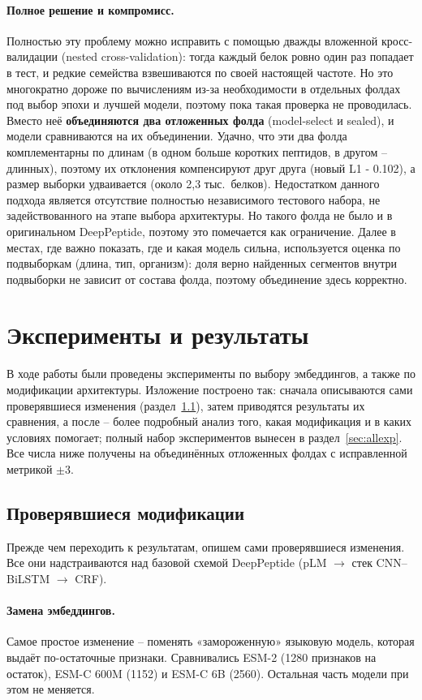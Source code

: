 \documentclass{article}
\begin{document}
\paragraph{Полное решение и компромисс.} Полностью эту проблему можно исправить с помощью дважды вложенной кросс-валидации (nested cross-validation): тогда каждый белок ровно один раз попадает в тест, и редкие семейства взвешиваются по своей настоящей частоте. Но это многократно дороже по вычислениям из-за необходимости в отдельных фолдах под выбор эпохи и лучшей модели, поэтому пока такая проверка не проводилась. Вместо неё \textbf{объединяются два отложенных фолда} (model-select и sealed), и модели сравниваются на их объединении. Удачно, что эти два фолда комплементарны по длинам (в одном больше коротких пептидов, в другом -- длинных), поэтому их отклонения компенсируют друг друга (новый L1 - 0.102), а размер выборки удваивается (около 2{,}3 тыс.\ белков). Недостатком данного подхода является отсутствие полностью независимого тестового набора, не задействованного на этапе выбора архитектуры. Но такого фолда не было и в оригинальном DeepPeptide, поэтому это помечается как ограничение. Далее в местах, где важно показать, где и какая модель сильна, используется оценка по подвыборкам (длина, тип, организм): доля верно найденных сегментов внутри подвыборки не зависит от состава фолда, поэтому объединение здесь корректно.

\section{Эксперименты и результаты}
В ходе работы были проведены эксперименты по выбору эмбеддингов, а также по модификации архитектуры. Изложение построено так: сначала описываются сами проверявшиеся изменения (раздел~\ref{sec:modifications}), затем приводятся результаты их сравнения, а после -- более подробный анализ того, какая модификация и в каких условиях помогает; полный набор экспериментов вынесен в раздел~\ref{sec:allexp}. Все числа ниже получены на объединённых отложенных фолдах с исправленной метрикой $\pm3$.

\subsection{Проверявшиеся модификации}\label{sec:modifications}
Прежде чем переходить к результатам, опишем сами проверявшиеся изменения. Все они надстраиваются над базовой схемой DeepPeptide (pLM $\to$ стек CNN--BiLSTM $\to$ CRF).

\paragraph{Замена эмбеддингов.} Самое простое изменение -- поменять «замороженную» языковую модель, которая выдаёт по-остаточные признаки. Сравнивались ESM-2 (1280 признаков на остаток), ESM-C 600M (1152) и ESM-C 6B (2560). Остальная часть модели при этом не меняется.
\end{document}
